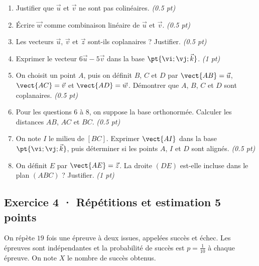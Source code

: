 \begin{enumerate}

\item Justifier que $\vec u$ et $\vec v$ ne sont pas colinéaires. \hfill\textit{(\num{0,5} pt)}

\item Écrire $\vec w$ comme combinaison linéaire de $\vec u$ et $\vec v$. \hfill\textit{(\num{0,5} pt)}

\item Les vecteurs $\vec u$, $\vec v$ et $\vec z$ sont-ils coplanaires ? Justifier. \hfill\textit{(\num{0,5} pt)}

\item Exprimer le vecteur $6\vec u-5\vec v$ dans la base $\pt{\vi;\vj;\vec k}$. \hfill\textit{(1 pt)}

\item On choisit un point $A$, puis on définit $B$, $C$ et $D$ par $\vect{AB}=\vec u$, $\vect{AC}=\vec v$ et $\vect{AD}=\vec w$. Démontrer que $A$, $B$, $C$ et $D$ sont coplanaires. \hfill\textit{(\num{0,5} pt)}

\item Pour les questions 6 à 8, on suppose la base orthonormée. Calculer les distances $AB$, $AC$ et $BC$. \hfill\textit{(\num{0,5} pt)}

\item On note $I$ le milieu de $[BC]$. Exprimer $\vect{AI}$ dans la base $\pt{\vi;\vj;\vec k}$, puis déterminer si les points $A$, $I$ et $D$ sont alignés. \hfill\textit{(\num{0,5} pt)}

\item On définit $E$ par $\vect{AE}=\vec z$. La droite $(DE)$ est-elle incluse dans le plan $(ABC)$ ? Justifier. \hfill\textit{(1 pt)}

\end{enumerate}

\subsection*{Exercice 4 · Répétitions et estimation \hfill 5 points}On répète $19$ fois une épreuve à deux issues, appelées succès et échec. Les épreuves sont indépendantes et la probabilité de succès est $p=\frac{1}{10}$ à chaque épreuve. On note $X$ le nombre de succès obtenus.

